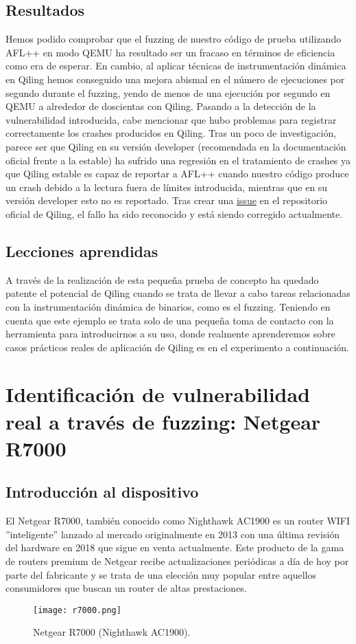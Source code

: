 \subsection{Resultados}
Hemos podido comprobar que el fuzzing de nuestro código de prueba utilizando AFL++ en modo QEMU ha resultado ser un fracaso en términos de 
eficiencia como era de esperar. En cambio,
al aplicar técnicas de instrumentación dinámica en Qiling hemos conseguido una mejora abismal en el número de ejecuciones por segundo durante el fuzzing, 
yendo de menos de una ejecución por segundo en QEMU a alrededor de doscientas con Qiling. Pasando a la detección de la vulnerabilidad introducida, 
cabe mencionar que hubo problemas para registrar correctamente los crashes producidos en Qiling. Tras un poco de investigación, parece ser que Qiling en su versión developer
(recomendada en la documentación oficial frente a la estable) ha sufrido una regresión en el tratamiento de crashes ya que Qiling estable es capaz de 
reportar a AFL++ cuando nuestro código produce un crash debido a la lectura fuera de límites introducida, mientras que en su versión developer esto no es reportado.
Tras crear una \href{https://github.com/qilingframework/qiling/issues/1163}{issue} en el repositorio oficial de Qiling\cite{qiling}, el fallo ha sido reconocido y está siendo corregido actualmente.


\subsection{Lecciones aprendidas}
A través de la realización de esta pequeña prueba de concepto ha quedado patente el potencial de Qiling cuando se trata de llevar a cabo tareas relacionadas
con la instrumentación dinámica de binarios, como es el fuzzing. Teniendo en cuenta que este ejemplo se trata solo de una pequeña toma de contacto con la herramienta
para introducirnos a su uso, donde realmente aprenderemos sobre casos prácticos reales de aplicación de Qiling es en el experimento a continuación.

\section{Identificación de vulnerabilidad real a través de fuzzing: Netgear R7000}
\subsection{Introducción al dispositivo}
El Netgear R7000, también conocido como Nighthawk AC1900 es un router WIFI ''inteligente'' lanzado al mercado originalmente en 2013 con una última
revisión del hardware en 2018 que sigue en venta actualmente. Este producto de la gama de routers premium de Netgear recibe actualizaciones periódicas
a día de hoy por parte del fabricante y se trata de una elección muy popular entre aquellos consumidores que buscan un router de altas prestaciones. 
\begin{figure}[H]
    \centering
    \texttt{[image: r7000.png]}
    \caption{Netgear R7000 (Nighthawk AC1900).}
    \label{fig:r7000}
\end{figure}


